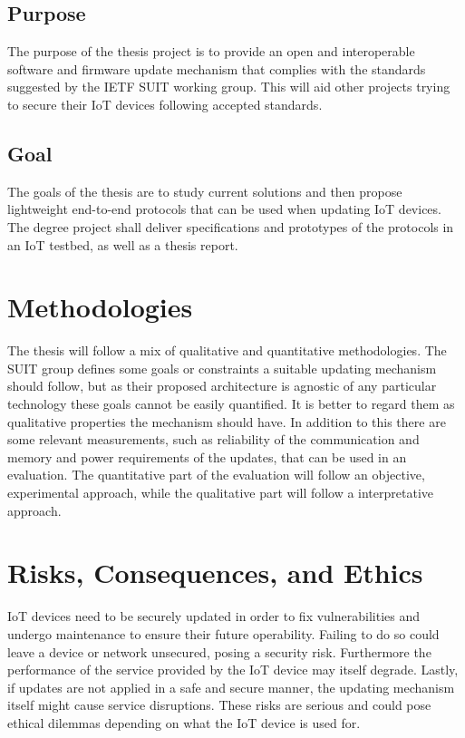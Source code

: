 \documentclass[0-thesis.tex]{subfiles}
\begin{document}
\subsection{Purpose}
The purpose of the thesis project is to provide an open and interoperable software and firmware update 
mechanism that complies with the standards suggested by the IETF SUIT working group. This will aid other 
projects trying to secure their IoT devices following accepted standards.

\subsection{Goal}
The goals of the thesis are to study current solutions and then propose lightweight end-to-end protocols 
that can be used when updating IoT devices. The degree project shall deliver specifications and prototypes
of the protocols in an IoT testbed, as well as a thesis report.

\section{Methodologies}
The thesis will follow a mix of qualitative and quantitative methodologies. The SUIT group defines some 
goals or constraints a suitable updating mechanism should follow, but as their proposed architecture is 
agnostic of any particular technology these goals cannot be easily quantified. It is better to regard them 
as qualitative properties the mechanism should have. In addition to this there are some relevant measurements,
such as reliability of the communication and memory and power requirements of the updates, that can be used 
in an evaluation. The quantitative part of the evaluation will follow an objective, experimental approach, while 
the qualitative part will follow a interpretative approach.

\section{Risks, Consequences, and Ethics}
IoT devices need to be securely updated in order to fix vulnerabilities and undergo maintenance to ensure 
their future operability. Failing to do so could leave a device or network unsecured, posing a security risk. 
Furthermore the performance of the service provided by the IoT device may itself degrade. Lastly, if updates 
are not applied in a safe and secure manner, the updating mechanism itself might cause service disruptions.
These risks are serious and could pose ethical dilemmas depending on what the IoT device is used for.
\end{document}
